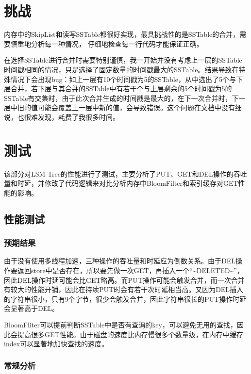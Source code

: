 \documentclass[fontset=windows]{article}
\begin{document}
\section{挑战}
内存中的SkipList和读写SSTable都很好实现，最具挑战性的是SSTable的合并，需要慎重地分析每一种情况，
仔细地检查每一行代码才能保证正确。

在选择SSTable进行合并时需要特别谨慎，我一开始并没有考虑上一层的SSTable时间戳相同的情况，只是选择了固定数量的时间戳最大的SSTable。结果导致在特殊情况下会出现bug：如上一层有10个时间戳为5的SSTable，从中选出了5个与下层合并，若下层与其合并的SSTable中有若干个与上层剩余的5个时间戳为5的SSTable有交集时，由于此次合并生成的时间戳是最大的，在下一次合并时，下一层中旧的值可能会覆盖上一层中新的值，会导致错误。这个问题在文档中没有细说，也很难发现，耗费了我很多时间。


\section{测试}
该部分对LSM Tree的性能进行了测试，主要分析了PUT、GET和DEL操作的吞吐量和时延，并修改了代码逻辑来对比分析内存中BloomFilter和索引缓存对GET性能的影响。


\subsection{性能测试}

\subsubsection{预期结果}
由于没有使用多线程加速，三种操作的吞吐量和时延应为倒数关系。由于DEL操作要返回store中是否存在，所以要先做一次GET，再插入一个``\textasciitilde DELETED\textasciitilde ''，因此DEL操作时延可能会比GET略高。而PUT操作可能会触发合并，而一次合并有较大的性能开销，因此在持续PUT时会有若干次时延相当高。又因为DEL插入的字符串很小，只有9个字节，很少会触发合并，因此字符串很长的PUT操作时延会显著高于DEL。

BloomFliter可以提前判断SSTable中是否有查询的key，可以避免无用的查找，因此会提高很多GET性能。由于磁盘的速度比内存慢很多个数量级，在内存中缓存index可以显著地加快查找的速度。

\subsubsection{常规分析}
\end{document}
